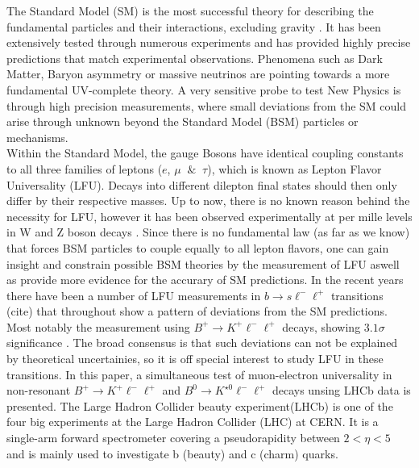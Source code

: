 \documentclass[%
 reprint,
 amsmath,amssymb,
 aps,
]{revtex4-2}
\begin{document}
The Standard Model (SM) is the most successful theory for describing the fundamental particles and their interactions, excluding gravity \cite{buchmüller2006field,PhysRevLett.19.1264}.
It has been extensively tested through numerous experiments and has provided highly precise predictions that match experimental observations. Phenomena such as Dark Matter, Baryon asymmetry or
massive neutrinos are pointing towards a more fundamental UV-complete theory. %
A very sensitive probe to test New Physics is through high precision measurements, where small deviations from the SM could arise 
through unknown beyond the Standard Model (BSM) particles or mechanisms. 
\\
Within the Standard Model, the gauge Bosons have identical coupling constants to all three families of leptons ($e$, $\mu$ $~\&~$ $\tau$),
which is known as Lepton Flavor Universality (LFU). Decays into different dilepton final states should then only differ by their respective masses. 
\newline
Up to now, there is no known reason behind the necessity for LFU, however it has been observed experimentally at per mille levels 
in W and Z boson decays \cite{PhysRevLett.68.3398,Abachi_1995}. Since there is no fundamental law (as far as we know) that forces BSM particles to couple equally to all
lepton flavors, one can gain insight and constrain possible BSM theories by the measurement of LFU aswell as provide more evidence for the accurary of SM predictions.
\newline
In the recent years there have been a number of LFU measurements in $b \to s {\ell}^{-} {\ell}^{+}$
transitions (cite) that throughout show a pattern of deviations from the SM predictions. 
Most notably the measurement using $B^+ \to K^+ {\ell}^{-} {\ell}^{+}$ decays, showing $3.1 \sigma$ significance \cite{blhcb}.
The broad consensus is \cite{Bordone_2016,Isidori_2020} that such deviations can not be explained by theoretical uncertainies, 
so it is off special interest to study LFU in these transitions. In this paper, a simultaneous test of muon-electron
universality in non-resonant $B^+ \to K^+ {\ell}^{-} {\ell}^{+}$ and $B^0 \to K^{\star 0} {\ell}^{-} {\ell}^{+}$ decays unsing LHCb data is presented.
\newline
The Large Hadron Collider beauty experiment(LHCb) \cite{LHCb:2008vvz} is one of the four big experiments at the Large Hadron Collider (LHC) at CERN. It is a single-arm forward
spectrometer covering a pseudorapidity between $2 < \eta < 5$ and is mainly used to investigate b (beauty) and c (charm) quarks.
\end{document}
